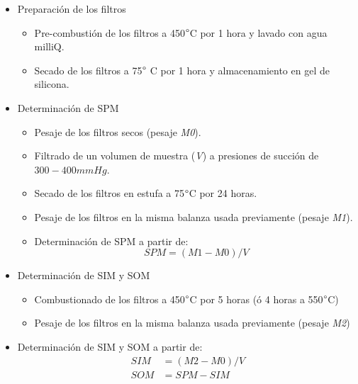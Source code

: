         \begin{itemize}
            \item Preparación de los filtros
            \begin{itemize}
                \item Pre-combustión de los filtros a 450$\degree$C por 1 hora y lavado con agua milliQ.
                \item Secado de los filtros a 75$\degree$ C por 1 hora y almacenamiento en gel de silicona.
            \end{itemize}
            \item Determinación de SPM
                \begin{itemize}
                    \item Pesaje de los filtros secos (pesaje \textit{M0}).
                    \item Filtrado de un volumen de muestra (\textit{V}) a presiones de succión de $300-400 mmHg$.
                    \item Secado de los filtros en estufa a 75$\degree$C por 24 horas.
                    \item Pesaje de los filtros en la misma balanza usada previamente (pesaje \textit{M1}).
                    \item Determinación de SPM a partir de:
                        \begin{equation}
                            SPM = (M1-M0)/V
                            \label{dat:eq:SPM}
                        \end{equation}
                \end{itemize}
            \item Determinación de SIM y SOM
                \begin{itemize}
                    \item Combustionado de los filtros a 450$\degree$C por 5 horas (ó 4 horas a 550$\degree$C)
                    \item Pesaje de los filtros en la misma balanza usada previamente (pesaje \textit{M2})
                \end{itemize}
                \item Determinación de SIM y SOM a partir de:
                \begin{align}
                    SIM & = (M2-M0)/V\\
                    SOM & = SPM-SIM
                \end{align}
        \end{itemize}

